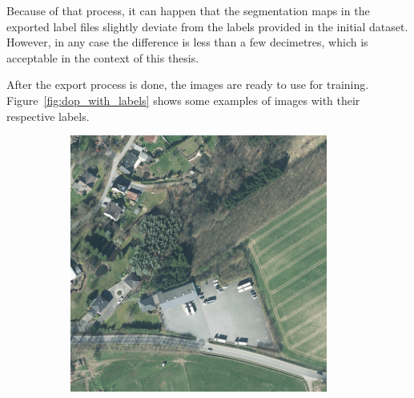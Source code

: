 Because of that process, it can happen that the segmentation maps in the exported label files slightly deviate from the labels provided in the initial dataset. However, in any case the difference is less than a few decimetres, which is acceptable in the context of this thesis.

After the export process is done, the images are ready to use for training. Figure~\ref{fig:dop_with_labels} shows some examples of images with their respective labels.

\begin{figure}
    \newcommand{\DopLabelImageWidth}{0.23\textwidth}
    \centering
    \hfill
    \begin{subfigure}{\DopLabelImageWidth}
        \includegraphics[width=\textwidth]{images/186_image}
    \end{subfigure}
    \hfill
    \begin{subfigure}{\DopLabelImageWidth}

\end{subfigure}
\end{figure}
